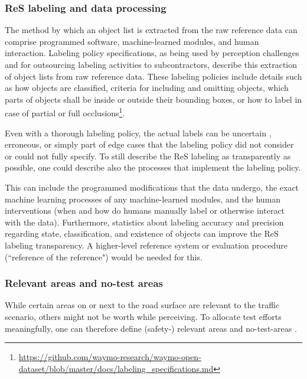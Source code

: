 \documentclass[conference]{IEEEtran}
\begin{document}
\subsubsection{ReS labeling and data processing}
\label{sec:basic_ref_labeling}

The method by which an object list is extracted from the raw reference data %
can comprise programmed software, machine-learned modules, and human interaction. 
Labeling policy specifications, as being used by perception challenges and for outsourcing labeling activities to subcontractors, describe this extraction of object lists from raw reference data. 
These labeling policies include details such as how objects are classified, criteria for including and omitting objects, which parts of objects shall be inside or outside their bounding boxes, or how to label in case of partial or full occlusions\footnote{\url{https://github.com/waymo-research/waymo-open-dataset/blob/master/docs/labeling_specifications.md}}.

Even with a thorough labeling policy, the actual labels can be uncertain \cite{wang2020inferring}, erroneous, or simply part of edge cases that the labeling policy did not consider or could not fully specify.
To still describe the ReS labeling as transparently as possible, one could describe also the processes that implement the labeling policy.

This can include
the programmed modifications that the data undergo, the exact machine learning processes of any machine-learned modules, and the human interventions (when and how do humans manually label or otherwise interact with the data).
Furthermore, statistics about labeling accuracy and precision regarding state, classification, and existence of objects can improve the ReS labeling transparency.
A higher-level reference system or evaluation procedure (``reference of the reference") would be needed for this.


\subsubsection{Relevant areas and no-test areas}
\label{sec:basic_areas}

While certain areas on or next to the road surface are relevant to the traffic scenario, others might not be worth while perceiving. 
To allocate test efforts meaningfully, one can therefore define (safety-) relevant areas and no-test-areas \cite{Philipp2022systematization, Topan2022zones, Butz2020soca, Wolf2021people, Chu2023sotif}.
\end{document}
